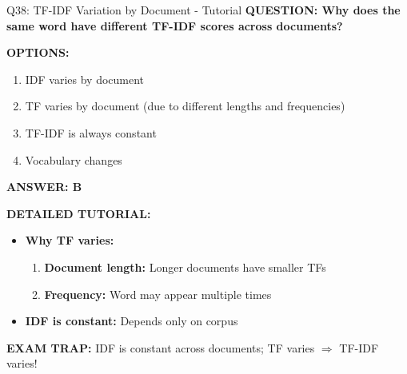 \documentclass[8pt]{beamer}
\begin{document}
	\begin{frame}{Q38: TF-IDF Variation by Document - Tutorial}
		\fontsize{6.5}{7.5}\selectfont
		\textbf{QUESTION: Why does the same word have different TF-IDF scores across documents?}
		
		\vspace{0.1cm}
		\textbf{OPTIONS:}
		\begin{enumerate}
			\item IDF varies by document
			\item TF varies by document (due to different lengths and frequencies)
			\item TF-IDF is always constant
			\item Vocabulary changes
		\end{enumerate}
		
		\vspace{0.1cm}
		\textcolor{myblue}{\textbf{ANSWER: B}}
		
		\vspace{0.1cm}
		\textbf{DETAILED TUTORIAL:}
		\begin{itemize}
			\item \textbf{Why TF varies:}
			\begin{enumerate}
				\item \textbf{Document length:} Longer documents have smaller TFs
				\item \textbf{Frequency:} Word may appear multiple times
			\end{enumerate}
			\item \textbf{IDF is constant:} Depends only on corpus
		\end{itemize}
		
		\textcolor{myred}{\textbf{EXAM TRAP:}} IDF is \textcolor{myblue}{constant across documents}; TF varies $\Rightarrow$ TF-IDF varies!
	\end{frame}
	
\end{document}
